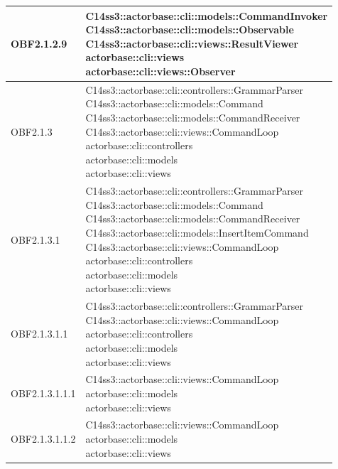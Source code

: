 \documentclass{scalatekids-article}
\begin{document}
\begin{longtable}[H]{|p{4.5cm}|p{13cm}|}
\hline
OBF2.1.2.9 & \multiLineCell[t]{C14ss3::actorbase::cli::models::CommandInvoker\\C14ss3::actorbase::cli::models::Observable\\C14ss3::actorbase::cli::views::ResultViewer\\actorbase::cli::views\\actorbase::cli::views::Observer\\}\\
\hline
OBF2.1.3 & \multiLineCell[t]{C14ss3::actorbase::cli::controllers::GrammarParser\\C14ss3::actorbase::cli::models::Command\\C14ss3::actorbase::cli::models::CommandReceiver\\C14ss3::actorbase::cli::views::CommandLoop\\actorbase::cli::controllers\\actorbase::cli::models\\actorbase::cli::views\\}\\
\hline
OBF2.1.3.1 & \multiLineCell[t]{C14ss3::actorbase::cli::controllers::GrammarParser\\C14ss3::actorbase::cli::models::Command\\C14ss3::actorbase::cli::models::CommandReceiver\\C14ss3::actorbase::cli::models::InsertItemCommand\\C14ss3::actorbase::cli::views::CommandLoop\\actorbase::cli::controllers\\actorbase::cli::models\\actorbase::cli::views\\}\\
\hline
OBF2.1.3.1.1 & \multiLineCell[t]{C14ss3::actorbase::cli::controllers::GrammarParser\\C14ss3::actorbase::cli::views::CommandLoop\\actorbase::cli::controllers\\actorbase::cli::models\\actorbase::cli::views\\}\\
\hline
OBF2.1.3.1.1.1 & \multiLineCell[t]{C14ss3::actorbase::cli::views::CommandLoop\\actorbase::cli::models\\actorbase::cli::views\\}\\
\hline
OBF2.1.3.1.1.2 & \multiLineCell[t]{C14ss3::actorbase::cli::views::CommandLoop\\actorbase::cli::models\\actorbase::cli::views\\}\\

\end{longtable}
\end{document}
